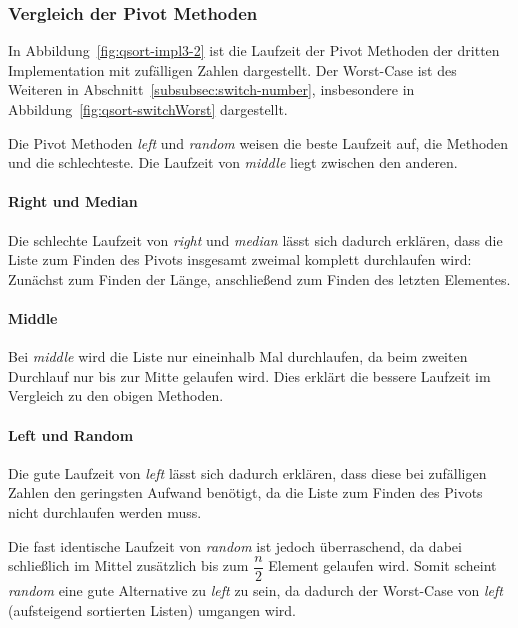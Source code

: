 \subsubsection{Vergleich der Pivot Methoden}\label{subsubsec:qsort-pivots}

In Abbildung~\ref{fig:qsort-impl3-2} ist die Laufzeit der Pivot Methoden der
dritten Implementation mit zufälligen Zahlen dargestellt.
Der Worst-Case ist des Weiteren in Abschnitt~\ref{subsubsec:switch-number},
insbesondere in Abbildung~\ref{fig:qsort-switchWorst} dargestellt.

Die Pivot Methoden \textit{left} und \textit{random} weisen die beste
Laufzeit auf, die Methoden  und  die schlechteste.
Die Laufzeit von \textit{middle} liegt zwischen den anderen.

\paragraph{Right und Median}
Die schlechte Laufzeit von \textit{right} und \textit{median} lässt sich
dadurch erklären, dass die Liste zum Finden des Pivots insgesamt zweimal
komplett durchlaufen wird:
Zunächst zum Finden der Länge, anschließend zum Finden des letzten Elementes.

\paragraph{Middle}
Bei \textit{middle} wird die Liste nur eineinhalb Mal durchlaufen, da beim
zweiten Durchlauf nur bis zur Mitte gelaufen wird.
Dies erklärt die bessere Laufzeit im Vergleich zu den obigen Methoden.

\paragraph{Left und Random}
Die gute Laufzeit von \textit{left} lässt sich dadurch erklären, dass diese bei
zufälligen Zahlen den geringsten Aufwand benötigt, da die Liste zum Finden
des Pivots nicht durchlaufen werden muss.

Die fast identische Laufzeit von \textit{random} ist jedoch überraschend, da
dabei schließlich im Mittel zusätzlich bis zum \(\dfrac{n}{2}\) Element gelaufen
wird.
Somit scheint \textit{random} eine gute Alternative zu \textit{left} zu sein,
da dadurch der Worst-Case von \textit{left} (aufsteigend sortierten Listen)
umgangen wird.


